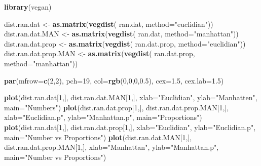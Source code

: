 \documentclass[twocolumn]{article}
\newenvironment{Shaded}{\begin{snugshade}}{\end{snugshade}}
\newcommand{\KeywordTok}[1]{\textcolor[rgb]{0.13,0.29,0.53}{\textbf{{#1}}}}
\newcommand{\DataTypeTok}[1]{\textcolor[rgb]{0.13,0.29,0.53}{{#1}}}
\newcommand{\DecValTok}[1]{\textcolor[rgb]{0.00,0.00,0.81}{{#1}}}
\newcommand{\FloatTok}[1]{\textcolor[rgb]{0.00,0.00,0.81}{{#1}}}
\newcommand{\StringTok}[1]{\textcolor[rgb]{0.31,0.60,0.02}{{#1}}}
\newcommand{\NormalTok}[1]{{#1}}
\begin{document}
\begin{Shaded}
\begin{Highlighting}[]
\KeywordTok{library}\NormalTok{(vegan)}

\NormalTok{dist.ran.dat <-}\StringTok{ }\KeywordTok{as.matrix}\NormalTok{(}\KeywordTok{vegdist}\NormalTok{(}
    \NormalTok{ran.dat, }\DataTypeTok{method=}\StringTok{"euclidian"}\NormalTok{))}
\NormalTok{dist.ran.dat.MAN <-}\StringTok{ }\KeywordTok{as.matrix}\NormalTok{(}\KeywordTok{vegdist}\NormalTok{(}
    \NormalTok{ran.dat, }\DataTypeTok{method=}\StringTok{"manhattan"}\NormalTok{))}
\NormalTok{dist.ran.dat.prop <-}\StringTok{ }\KeywordTok{as.matrix}\NormalTok{(}\KeywordTok{vegdist}\NormalTok{(}
    \NormalTok{ran.dat.prop, }\DataTypeTok{method=}\StringTok{"euclidian"}\NormalTok{))}
\NormalTok{dist.ran.dat.prop.MAN <-}\StringTok{ }\KeywordTok{as.matrix}\NormalTok{(}\KeywordTok{vegdist}\NormalTok{(}
    \NormalTok{ran.dat.prop, }\DataTypeTok{method=}\StringTok{"manhattan"}\NormalTok{))}

\KeywordTok{par}\NormalTok{(}\DataTypeTok{mfrow=}\KeywordTok{c}\NormalTok{(}\DecValTok{2}\NormalTok{,}\DecValTok{2}\NormalTok{), }\DataTypeTok{pch=}\DecValTok{19}\NormalTok{, }\DataTypeTok{col=}\KeywordTok{rgb}\NormalTok{(}\DecValTok{0}\NormalTok{,}\DecValTok{0}\NormalTok{,}\DecValTok{0}\NormalTok{,}\FloatTok{0.5}\NormalTok{),}
    \DataTypeTok{cex=}\FloatTok{1.5}\NormalTok{, }\DataTypeTok{cex.lab=}\FloatTok{1.5}\NormalTok{)}

\KeywordTok{plot}\NormalTok{(dist.ran.dat[}\DecValTok{1}\NormalTok{,], dist.ran.dat.MAN[}\DecValTok{1}\NormalTok{,],}
    \DataTypeTok{xlab=}\StringTok{"Euclidian"}\NormalTok{, }\DataTypeTok{ylab=}\StringTok{"Manhatten"}\NormalTok{,}
    \DataTypeTok{main=}\StringTok{"Numbers"}\NormalTok{)}
\KeywordTok{plot}\NormalTok{(dist.ran.dat.prop[}\DecValTok{1}\NormalTok{,], dist.ran.dat.prop.MAN[}\DecValTok{1}\NormalTok{,],}
    \DataTypeTok{xlab=}\StringTok{"Euclidian.p"}\NormalTok{, }\DataTypeTok{ylab=}\StringTok{"Manhattan.p"}\NormalTok{,}
    \DataTypeTok{main=}\StringTok{"Proportions"}\NormalTok{)}
\KeywordTok{plot}\NormalTok{(dist.ran.dat[}\DecValTok{1}\NormalTok{,], dist.ran.dat.prop[}\DecValTok{1}\NormalTok{,],}
    \DataTypeTok{xlab=}\StringTok{"Euclidian"}\NormalTok{, }\DataTypeTok{ylab=}\StringTok{"Euclidian.p"}\NormalTok{,}
    \DataTypeTok{main=}\StringTok{"Number vs Proportions"}\NormalTok{)}
\KeywordTok{plot}\NormalTok{(dist.ran.dat.MAN[}\DecValTok{1}\NormalTok{,], dist.ran.dat.prop.MAN[}\DecValTok{1}\NormalTok{,],}
    \DataTypeTok{xlab=}\StringTok{"Manhattan"}\NormalTok{, }\DataTypeTok{ylab=}\StringTok{"Manhattan.p"}\NormalTok{,}
    \DataTypeTok{main=}\StringTok{"Number vs Proportions"}\NormalTok{)}
\end{Highlighting}
\end{Shaded}
\end{document}
